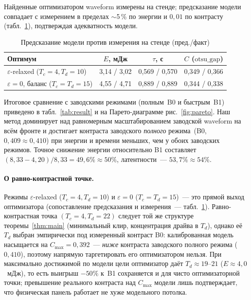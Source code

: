 Найденные оптимизатором waveform измерены на стенде; предсказание модели
совпадает с измерением в пределах $\sim$5\,\% по энергии и $0{,}01$ по контрасту
(табл.~\ref{tab:pred-meas}), подтверждая адекватность модели.

\begin{table}[ht]
    \centering
    \caption{Предсказание модели против измерения на стенде (пред./факт)}
    \label{tab:pred-meas}
    \small\setlength{\tabcolsep}{5pt}
    \begin{tabular}{lccc}
        \toprule
        Оптимум & $E$, мДж & $\tau$, с & $C$ ($\mathrm{otsu\_gap}$) \\
        \midrule
        $\varepsilon$-relaxed ($T_c{=}4,T_d{=}10$) & 3{,}14 / 3{,}02 & 0{,}569 / 0{,}570 & 0{,}349 / 0{,}366 \\
        $\varepsilon{=}0$, баланс ($T_c{=}T_d{=}15$) & 4{,}55 / 4{,}71 & 0{,}889 / 0{,}889 & 0{,}344 / 0{,}338 \\
        \bottomrule
    \end{tabular}
\end{table}

Итоговое сравнение с заводскими режимами (полным~B0 и быстрым~B1) приведено в
табл.~\ref{tab:result} и на Парето-диаграмме рис.~\ref{fig:pareto}. Наш метод
доминирует над равномерным масштабированием заводской waveform на всём фронте и
достигает контраста заводского \emph{полного} режима~(B0, $0{,}409\approx0{,}410$)
при энергии и времени меньших, чем у обоих заводских режимов.
Точное снижение энергии относительно B1 составляет
$(8{,}33-4{,}20)/8{,}33=49{,}6\%\approx50\%$, латентности~--- $53{,}7\%\approx54\%$.

\paragraph{О равно-контрастной точке.} Режимы $\varepsilon$-relaxed
($T_c{=}4,T_d{=}10$) и $\varepsilon{=}0$ ($T_c{=}T_d{=}15$)~--- это прямой выход
оптимизатора (сопоставление предсказания и измерения~--- табл.~\ref{tab:pred-meas}).
Равно-контрастная точка $(T_c{=}4,T_d{=}22)$ следует той же структуре
теоремы~\ref{thm:main} (минимальный клир, концентрация драйва в $T_d$), однако её
$T_d$ выбран эмпирически под измеренный контраст B0: калиброванная модель
насыщается на $C_{\max}{=}0{,}392$~--- \emph{ниже} контраста заводского полного
режима ($0{,}410$), поэтому напрямую таргетировать его оптимизатором нельзя. При
максимально достижимой по модели цели оптимизатор даёт $T_d\approx19\text{--}21$
($E\approx4{,}0$~мДж), то есть выигрыш $-50\%$ к~B1 сохраняется и для чисто
оптимизаторной точки; превышение реального контраста над $C_{\max}$ модели лишь
подтверждает, что физическая панель работает не хуже модельного потолка.

